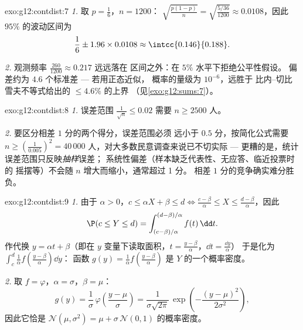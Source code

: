 \begin{solution}{exo:g12:contdist:7}
\emph{1.} 取 $p = \frac16$，$n = 1200$：
$\sqrt{\frac{p(1-p)}{n}} = \sqrt{\frac{5/36}{1200}} \approx 0.0108$，因此
$95\%$ 的波动区间为
\[
\frac16 \pm 1.96 \times 0.0108 \approx \intcc{0.146}{0.188}.
\]

\emph{2.} 观测频率 $\frac{260}{1200} \approx 0.217$ 远远落在
区间之外：在 $5\%$ 水平下拒绝公平性假设。
偏差约为 $4.6$ 个标准差 --- 若用正态近似，
概率的量级为 $10^{-6}$，远胜于
比内–切比雪夫不等式给出的 $\leq 4.6\%$ 的上界
（见\cref{exo:g12:sums:7}）。
\end{solution}

\begin{solution}{exo:g12:contdist:8}
\emph{1.} 误差范围 $\frac{1}{\sqrt n} \leq 0.02$ 需要
$n \geq 2500$ 人。

\emph{2.} 要区分相差 $1$ 分的两个得分，误差范围必须
远小于 $0.5$ 分，按简化公式需要 $n \geq \left(\frac{1}{0.005}\right)^2 =
40\,000$ 人，对大多数民意调查来说已不切实际 ---
更糟的是，统计误差范围只反映\emph{抽样}误差；
系统性偏差（样本缺乏代表性、无应答、临近投票时的
摇摆等）不会随 $n$ 增大而缩小，通常超过 1 分。
相差 $1$ 分的竞争确实难分胜负。
\end{solution}

\begin{solution}{exo:g12:contdist:9}
\emph{1.} 由于 $\alpha > 0$，$c \leq \alpha X + \beta \leq d
\iff \frac{c - \beta}{\alpha} \leq X \leq \frac{d - \beta}{\alpha}$，因此
\[
\P(c \leq Y \leq d)
= \int_{(c-\beta)/\alpha}^{(d-\beta)/\alpha} f(t)\,\dd t .
\]
作代换 $y = \alpha t + \beta$（即在 $y$
变量下读取面积，$t = \frac{y - \beta}{\alpha}$，$\dd t = \frac{\dd y}{\alpha}$）
于是化为
$\int_c^d \frac{1}{\alpha} f\left(\frac{y-\beta}{\alpha}\right)\dd y$：
函数 $g(y) = \frac1\alpha f\left(\frac{y-\beta}{\alpha}\right)$ 是
$Y$ 的一个概率密度。

\emph{2.} 取 $f = \varphi$，$\alpha = \sigma$，$\beta = \mu$：
\[
g(y) = \frac{1}{\sigma}\,\varphi\!\left(\frac{y - \mu}{\sigma}\right)
= \frac{1}{\sigma\sqrt{2\pi}}\,
\exp\left(-\frac{(y-\mu)^2}{2\sigma^2}\right),
\]
因此它恰是
$\mathcal N(\mu, \sigma^2) = \mu + \sigma\,\mathcal N(0,1)$ 的概率密度。
\end{solution}

